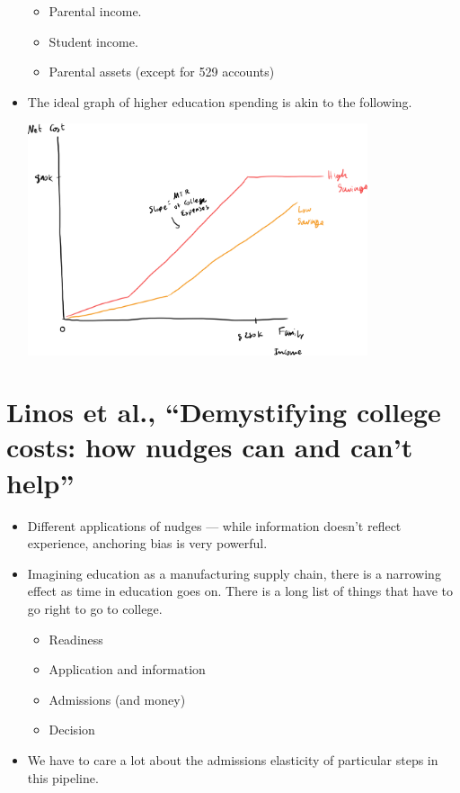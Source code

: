 \documentclass[10pt]{extarticle}
\begin{document}
\begin{itemize}
\begin{itemize}
        \item Parental income.
        \item Student income.
        \item Parental assets (except for 529 accounts)
      \end{itemize}
    \item The ideal graph of higher education spending is akin to the following.
      \begin{center}
        \includegraphics[width=10cm]{images/higher_ed_cost_curve.png}
      \end{center}
  \end{itemize}
  \section{Linos et al., ``Demystifying college costs: how nudges can and can't help''}%
  \begin{itemize}
    \item Different applications of nudges --- while information doesn't reflect experience, anchoring bias is very powerful.
    \item Imagining education as a manufacturing supply chain, there is a narrowing effect as time in education goes on. There is a long list of things that have to go right to go to college.
      \begin{itemize}
        \item Readiness
        \item Application and information
        \item Admissions (and money)
        \item Decision
      \end{itemize}
    \item We have to care a lot about the admissions elasticity of particular steps in this pipeline.
  \end{itemize}
\end{document}
